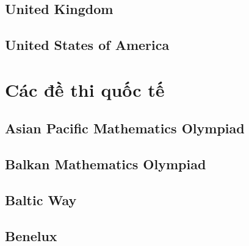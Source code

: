 \documentclass[../the-book.tex]{subfiles}
\begin{document}
\subsection*{United Kingdom}






\subsection*{United States of America}







\section{Các đề thi quốc tế}

\subsection*{Asian Pacific Mathematics Olympiad}




\subsection*{Balkan Mathematics Olympiad}









\subsection*{Baltic Way}







\subsection*{Benelux}


\end{document}
